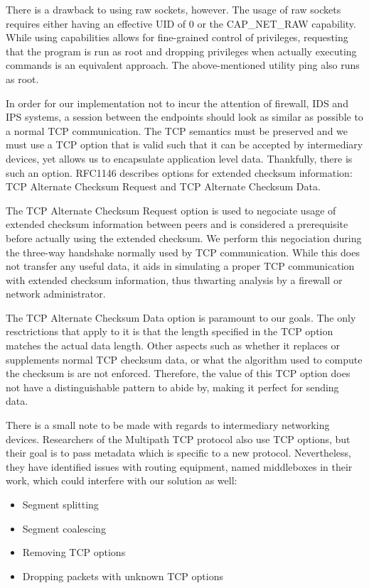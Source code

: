 There is a drawback to using raw sockets, however. The usage of raw sockets
requires either having an effective UID of 0 or the CAP_NET_RAW capability.
While using capabilities allows for fine-grained control of privileges, requesting
that the program is run as root and dropping privileges when actually executing
commands is an equivalent approach. The above-mentioned utility ping also
runs as root.

In order for our implementation not to incur the attention of firewall, IDS and
IPS systems, a session between the endpoints should look as similar as possible
to a normal TCP communication. The TCP semantics must be preserved and we must
use a TCP option that is valid such that it can be accepted by intermediary
devices, yet allows us to encapsulate application level data. Thankfully, there
is such an option. RFC1146 \cite{rfc1146} describes options for extended checksum
information: TCP Alternate Checksum Request and TCP Alternate Checksum Data.

The TCP Alternate Checksum Request option is used to negociate usage of extended
checksum information between peers and is considered a prerequisite before actually
using the extended checksum. We perform this negociation during the three-way
handshake normally used by TCP communication. While this does not transfer any
useful data, it aids in simulating a proper TCP communication with extended
checksum information, thus thwarting analysis by a firewall or network administrator.

The TCP Alternate Checksum Data option is paramount to our goals. The only
resctrictions that apply to it is that the length specified in the TCP option
matches the actual data length. Other aspects such as whether it replaces or
supplements normal TCP checksum data, or what the algorithm used to compute the
checksum is are not enforced. Therefore, the value of this TCP option does not
have a distinguishable pattern to abide by, making it perfect for sending data.

There is a small note to be made with regards to intermediary networking devices.
Researchers of the Multipath TCP protocol \cite{mptcp} also use TCP options, but
their goal is to pass metadata which is specific to a new protocol. Nevertheless,
they have identified issues with routing equipment, named middleboxes in their work,
which could interfere with our solution as well:
\begin{itemize}
\item Segment splitting
\item Segment coalescing
\item Removing TCP options
\item Dropping packets with unknown TCP options
\end{itemize}

